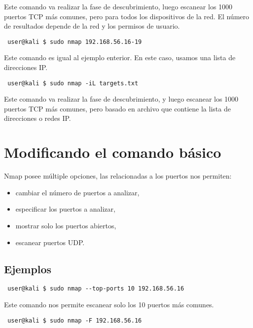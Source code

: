 \documentclass{article}
\begin{document}
Este comando va realizar la fase de descubrimiento, luego escanear los 1000 puertos TCP m\'as comunes, pero para todos los dispositivos de la red. El n\'umero de resultados depende de la red y los permisos de usuario.\\

\begin{lstlisting}
 user@kali $ sudo nmap 192.168.56.16-19
\end{lstlisting}

Este comando es igual al ejemplo enterior. En este caso, usamos una lista de direcciones IP.\\

\begin{lstlisting}
 user@kali $ sudo nmap -iL targets.txt
\end{lstlisting}

Este comando va realizar la fase de descubrimiento, y luego escanear los 1000 puertos TCP m\'as comunes, pero basado en archivo que contiene la lista de direcciones o redes IP.

\section{Modificando el comando b\'asico}

Nmap posee m\'ultiple opciones, las relacionadas a los puertos nos permiten:

\begin{itemize}
    \item cambiar el n\'umero de puertos a analizar,
    \item especificar los puertos a analizar,
    \item mostrar solo los puertos abiertos,
    \item escanear puertos UDP.
\end{itemize}

\subsection{Ejemplos}

\begin{lstlisting}
 user@kali $ sudo nmap --top-ports 10 192.168.56.16
\end{lstlisting}

Este comando nos permite escanear solo los 10 puertos m\'as comunes.

\begin{lstlisting}
 user@kali $ sudo nmap -F 192.168.56.16
\end{lstlisting}
\end{document}
